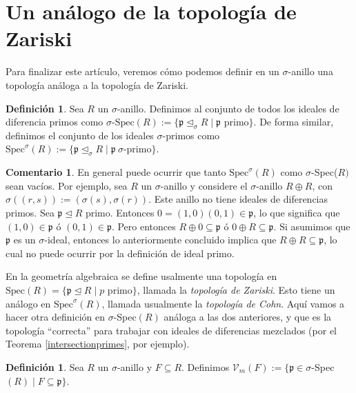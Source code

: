 \documentclass[letterpaper]{article}
\def\Spec{\text{Spec}}
\def\Vm{\mathcal{V}_m}
\def\p{\mathfrak{p}}
\def\s{\sigma}
\def\si{\unlhd_{\sigma}}
\theoremstyle{definition}
\newtheorem{rem}[Satz]{Comentario}
\newtheorem{defn}[Satz]{Definici\'on}
\begin{document}
\section{Un an\'alogo de la topolog\'ia de Zariski}\label{topologia}

Para finalizar este art\'iculo, veremos c\'omo podemos definir en un $\sigma$-anillo una topolog\'ia an\'aloga a la topolog\'ia de Zariski.

\begin{defn}
Sea $R$ un $\sigma$-anillo. Definimos al conjunto de todos los ideales de diferencia primos como $\s$-$\Spec(R):= \{ \p \si R \mid \p \text{ primo}\}$. De forma similar, definimos el conjunto de los ideales $\s$-primos como $\Spec^\s(R):= \{ \p \si R \mid \p ~ \s\text{-primo}\}$.
\end{defn}

\begin{rem}
En general puede ocurrir que tanto $\Spec^\sigma(R)$ como $\sigma$-Spec($R)$ sean vac\'ios. Por ejemplo, sea $R$ un $\sigma$-anillo y considere el $\sigma$-anillo $R \oplus R$, con $\s( (r,s)):= (\s(s),\s(r))$. Este anillo no tiene ideales de diferencias primos. Sea $\p \unlhd R$ primo. Entonces $0 = (1,0)(0,1) \in \p$, lo que significa que $(1,0) \in \p$ \'o $(0,1) \in \p$. Pero entonces $R \oplus 0 \subseteq \p$ \'o $0 \oplus R \subseteq \p$. Si asumimos que $\p$ es un $\sigma$-ideal, entonces
lo anteriormente concluido implica que $R \oplus R \subseteq \p$, lo cual no puede ocurrir por la definici\'on de ideal primo.
\end{rem}

En la geometr\'ia algebraica se define usalmente una topolog\'ia en $\Spec(R) = \{ \p \unlhd R \mid p \text { primo} \}$, llamada la \emph{topolog\'ia de Zariski}. Esto tiene un an\'alogo en $\Spec^\s(R)$, llamada usualmente la \emph{topolog\'ia de Cohn}. Aqu\'i vamos a hacer otra definici\'on en $\s$-Spec$(R)$ an\'aloga a las dos anteriores, y que es la topolog\'ia ``correcta'' para trabajar con ideales de diferencias mezclados (por el Teorema \ref{intersectionprimes}, por ejemplo).

\begin{defn}
Sea $R$ un $\sigma$-anillo y $F \subseteq R$. Definimos $\Vm (F):= \{ \p \in \s$-Spec$(R) \mid F \subseteq \p \}$. 
\end{defn}
\end{document}

